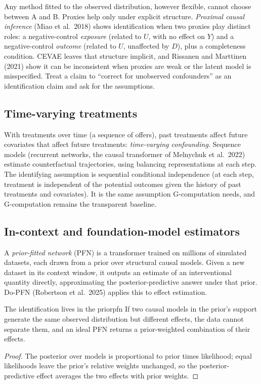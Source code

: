 \documentclass[11pt]{article}
\begin{document}
Any method fitted to the observed distribution, however flexible, cannot choose between A and B. Proxies help only
under explicit structure. \emph{Proximal causal inference} (Miao et al.\ 2018) shows
identification when two proxies play distinct roles: a negative-control \emph{exposure} (related to $U$, with no
effect on $Y$) and a negative-control \emph{outcome} (related to $U$, unaffected by $D$), plus a completeness
condition. CEVAE leaves that structure implicit, and Rissanen and Marttinen (2021) show it can be inconsistent when
proxies are weak or the latent model is misspecified. Treat a claim to ``correct for unobserved confounders'' as
an identification claim and ask for the assumptions.

\subsection{Time-varying treatments}

With treatments over time (a sequence of offers), past treatments affect future covariates that affect future
treatments: \emph{time-varying confounding}. Sequence models (recurrent networks, the causal transformer of
Melnychuk et al.\ 2022) estimate counterfactual trajectories, using balancing representations at
each step. The identifying assumption is sequential conditional independence (at each step, treatment is independent of
the potential outcomes given the history of past treatments and covariates). It is the same assumption
G-computation needs, and G-computation remains the transparent baseline.

\subsection{In-context and foundation-model estimators}

A \emph{prior-fitted network} (PFN) is a transformer trained on millions of simulated datasets, each drawn from a prior
over structural causal models. Given a new dataset in its context window, it outputs an estimate of an interventional
quantity directly, approximating the posterior-predictive answer under that prior. Do-PFN (Robertson et al.\ 2025)
applies this to effect estimation.

\begin{prop}{The identification lives in the prior}{pfn}
If two causal models in the prior's support generate the same observed distribution but different effects, the
data cannot separate them, and an ideal PFN returns a prior-weighted combination of their effects.
\end{prop}
\begin{proof}
The posterior over models is proportional to prior times likelihood; equal likelihoods leave the prior's relative
weights unchanged, so the posterior-predictive effect averages the two effects with prior weights.
\end{proof}
\end{document}

